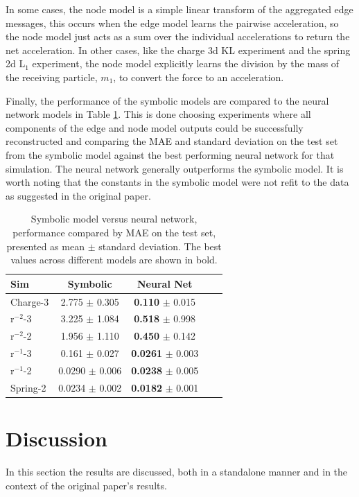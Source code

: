 \documentclass[11pt]{article}
\begin{document}
    In some cases, the node model is a simple linear transform of the aggregated edge messages, this occurs when the edge model learns the pairwise acceleration, so the node model just acts as a sum over the individual accelerations to return the net acceleration. In other cases, like the charge 3d KL experiment and the spring 2d L$_1$ experiment, the node model explicitly learns the division by the mass of the receiving particle, $m_1$, to convert the force to an acceleration.

    Finally, the performance of the symbolic models are compared to the neural network models in Table \ref{tab:sr_vs_nn_table}. This is done choosing experiments where all components of the edge and node model outputs could be successfully reconstructed and comparing the MAE and standard deviation on the test set from the symbolic model against the best performing neural network for that simulation. The neural network generally outperforms the symbolic model. It is worth noting that the constants in the symbolic model were not refit to the data as suggested in the original paper. 
    \begin{table}[H]
        \centering
        \begin{tabular}{lcccc}
        \hline
        Sim & Symbolic & Neural Net \\
        \hline
        Charge-3 & 2.775 $\pm$ 0.305 & \textbf{0.110} $\pm$ 0.015 \\
        r$^{-2}$-3 & 3.225 $\pm$ 1.084 & \textbf{0.518} $\pm$ 0.998\\
        r$^{-2}$-2 & 1.956 $\pm$ 1.110 & \textbf{0.450} $\pm$ 0.142 \\
        r$^{-1}$-3 & 0.161 $\pm$ 0.027 &\textbf{0.0261} $\pm$ 0.003 \\
        r$^{-1}$-2 & 0.0290 $\pm$ 0.006 & \textbf{0.0238} $\pm$ 0.005 \\
        Spring-2 & 0.0234 $\pm$ 0.002 &\textbf{0.0182} $\pm$ 0.001 \\
        \hline
        \end{tabular}
        \caption{Symbolic model versus neural network, performance compared by MAE on the test set, presented as mean $\pm$ standard deviation. The best values across different models are shown in bold.}
        \label{tab:sr_vs_nn_table}
    \end{table}
\section{Discussion}
In this section the results are discussed, both in a standalone manner and in the context of the original paper's results. 
\end{document}

